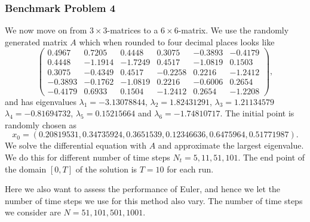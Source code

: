 \subsubsection{Benchmark Problem 4}\label{sec:benchmark problem 4}
We now move on from $3\times 3$-matrices to a $6\times 6$-matrix. We use the randomly generated matrix $A$ which when rounded to four decimal places looks like
\begin{equation}\label{eq:33mat2}
    \left(\begin{array}{cccccc}
        0.4967 & 0.7205 & 0.4448 &  0.3075 & -0.3893 & -0.4179 \\
        0.4448 & -1.1914 & -1.7249 & 0.4517 & -1.0819 & 0.1503 \\
        0.3075 & -0.4349 & 0.4517 & -0.2258 &  0.2216 & -1.2412 \\
        -0.3893 & -0.1762 & -1.0819 & 0.2216 & -0.6006 & 0.2654 \\
        -0.4179 & 0.6933 & 0.1504 & -1.2412 & 0.2654 & -1.2208
    \end{array}\right),
\end{equation}
and has eigenvalues $\lambda_1 = -3.13078844$, $\lambda_2=1.82431291$, $\lambda_3 = 1.21134579$ $\lambda_4=-0.81694732$,  $\lambda_5=0.15215664$ and $\lambda_6=-1.74810717$. The initial point is randomly chosen as
\begin{equation*}
    x_0 = (0.20819531, 0.34735924, 0.3651539,  0.12346636, 0.6475964,  0.51771987).
\end{equation*}
We solve the differential equation with $A$ and approximate the largest eigenvalue. We do this for different number of time steps $N_t=5, 11,51,101$. The end point of the domain $[0,T]$ of the solution is $T=10$ for each run.

Here we also want to assess the performance of Euler, and hence we let the number of time steps we use for this method also vary. The number of time steps we consider are $N=51,101,501,1001$.
